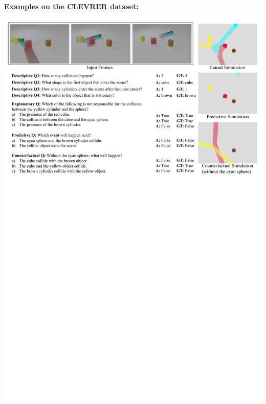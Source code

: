 \documentclass[landscape,a0paper,fontscale=0.292]{baposter}
\begin{document}
\begin{poster}
{    \vspace{-0.8em}
    \begin{minipage}[t]{0.49\textwidth}
        \textbf{\color{blue}Examples on the CLEVRER dataset:} 
        \vspace{-0.8em}
        \begin{center}
            \includegraphics[width=\textwidth]{images/visualize_7.pdf}
        \end{center}
    \end{minipage}\hfill
    \begin{minipage}[t]{0.49\textwidth}
        \textbf{\color{blue} } 
        \vspace{-0.8em}
        \begin{center}

\end{center}
\end{minipage}}
\end{poster}
\end{document}
